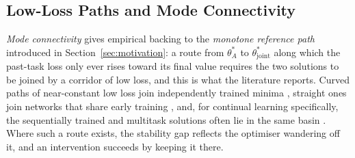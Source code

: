 \subsection{Low-Loss Paths and Mode Connectivity}
\label{subsec:lmc}

\emph{Mode connectivity} gives empirical backing to the \emph{monotone reference path} introduced in Section~\ref{sec:motivation}: a route from $\theta_A^*$ to $\theta_{\text{joint}}^*$ along which the past-task loss only ever rises toward its final value requires the two solutions to be joined by a corridor of low loss, and this is what the literature reports. Curved paths of near-constant low loss join independently trained minima \citep{garipov2018losssurfacesmodeconnectivity, draxler2019essentiallybarriersneuralnetwork}, straight ones join networks that share early training \citep{frankle2020linearmodeconnectivitylottery}, and, for continual learning specifically, the sequentially trained and multitask solutions often lie in the same basin \citep{mirzadeh2020linearmodeconnectivitymultitask}. Where such a route exists, the stability gap reflects the optimiser wandering off it, and an intervention succeeds by keeping it there.
